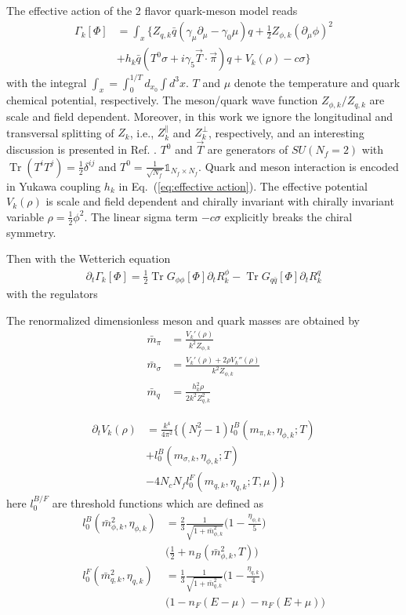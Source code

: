 \documentclass[%
reprint,
superscriptaddress,
showpacs,preprintnumbers,
 amsmath,amssymb,
 aps,
prd,
]{revtex4-1}
\newcommand{\Tr}{\ensuremath{\operatorname{Tr}}}
\def\Eq#1{Eq.~(\ref{#1})}
\begin{document}
The effective action of the 2 flavor quark-meson model reads \cite{Fu:2015naa}
\begin{align}
	\Gamma_k [\Phi]&=\int_x\{Z_{q,k} \bar q (\gamma_\mu \partial_\mu-\gamma_0 \mu)q +\frac{1}{2} Z_{\phi,k}(\partial_\mu \phi)^2  \nonumber\\[2ex]
	&+ h_k \bar q (T^0 \sigma +i \gamma_5\vec{T} \cdot \vec{\pi} )q +V_k(\rho) - c \sigma \} \label{eq:effective action}
\end{align}
with the integral $\int_x=\int_0^{1/T}d_{x_0}\int d^3 x$. $T$ and $\mu$ denote the temperature and quark chemical potential,  respectively. The meson/quark wave function $Z_{\phi,k}/Z_{q,k}$ are scale and field dependent. Moreover, in this work we ignore the  longitudinal  and transversal  splitting of $Z_k$, i.e., $Z_k^\parallel $ and $Z_k^\perp$,  respectively, and an interesting discussion is presented in Ref. \cite{Yin:2019ebz}. $T^0$ and $\vec{T}$ are generators of $SU (N_f=2)$ with $\Tr(T^iT^j)=\frac{1}{2} \delta^{ij}$ and $T^0=\frac{1}{\sqrt{N_f}} \mathbb{1}_{N_f \times N_f}$. Quark and meson interaction is encoded in Yukawa coupling $h_k$ in \Eq{eq:effective action}. The effective potential $V_k(\rho)$ is scale and field dependent and chirally invariant with chirally invariant variable $\rho=\frac{1}{2}\phi^2$. The linear sigma term $- c \sigma$ explicitly breaks the chiral symmetry.

Then with the Wetterich equation
\begin{align}
	\partial_t \Gamma_k [\Phi] = \frac{1}{2}\Tr G_{\phi \phi} [\Phi]  \partial_t R^\phi_k-\Tr G_{q \bar q}[\Phi] \partial_t R^q_k
\end{align}
with the regulators

The renormalized dimensionless meson and quark masses are obtained by
\begin{align}
	\bar m_\pi&=\frac{V_k'(\rho)}{k^2 Z_{\phi,k}} \\[2ex]
	\bar m_\sigma&= \frac{V_k'(\rho)+2 \rho V_k''(\rho)} {k^2 Z_{\phi,k}}\\[2ex]
	\bar m_q&=\frac{h_k^2 \rho}{2 k^2 Z_{q,k}^2}
\end{align}


\begin{align}
	\partial_t V_k(\rho) &=\frac{k^4}{4 \pi^2} \{ ( N_f^2-1)l_0^B(m_{\pi,k},\eta_{\phi,k} ; T)\nonumber\\[2ex]
	&+l_0^B(m_{\sigma,k},\eta_{\phi,k}; T) \nonumber\\[2ex]
	&-4N_c N_f l_0^F(m_{q,k},\eta_{q,k};T,\mu)\}
\end{align}
here $l_0^{B/F}$ are threshold functions which are defined as
\begin{align}
	l_0^B(\bar m_{\phi,k}^2,\eta_{\phi,k}) &=\frac{2}{3}\frac{1}{\sqrt{1+\bar m_{\phi,k}^2}} \Big ( 1-\frac{\eta_{\phi,k}}{5}\Big) \nonumber\\[2ex] 
	&\Big( \frac{1}{2}+n_B(\bar m_{\phi,k}^2,T) \Big)  \\[2ex]
	l_0^F(\bar m_{q,k}^2,\eta_{q,k})&=\frac{1}{3} \frac{1}{\sqrt{1+\bar m_{q,k}^2}} \Big(1-\frac{\eta_{q,k}}{4}\Big) \nonumber\\[2ex]
	&\Big(1-n_F(E-\mu)-n_F(E+\mu))
\end{align}
\end{document}
